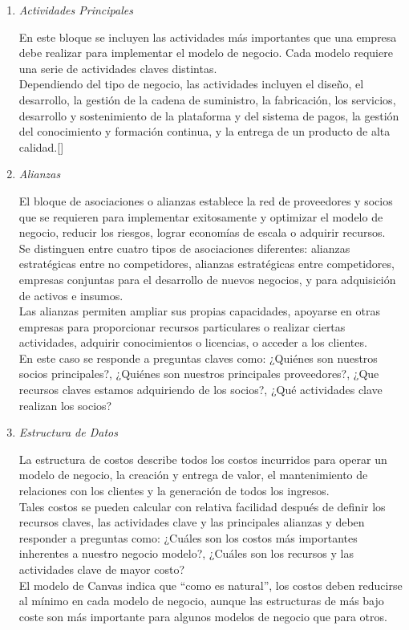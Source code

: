 \documentclass[10pt,a4paper]{article}
\begin{document}
\begin{multicols}{2}
\begin{enumerate}[1.]
			\item \textit{Actividades Principales}
			
			En este bloque se incluyen las actividades más importantes que una empresa debe realizar para implementar el modelo de negocio. Cada modelo requiere una serie de actividades claves distintas.\\
			
			Dependiendo del tipo de negocio, las actividades incluyen el diseño, el desarrollo, la gestión de la cadena de suministro, la fabricación, los servicios, desarrollo y sostenimiento de la plataforma y del sistema de pagos, la gestión del conocimiento y formación continua, y la entrega de un producto de alta calidad.[]
			
			\item \textit{Alianzas}
			
			El bloque de asociaciones o alianzas establece la red de proveedores y socios que se requieren para implementar exitosamente y optimizar el modelo de negocio, reducir los riesgos, lograr economías de escala o adquirir recursos.\\
			
			Se distinguen entre cuatro tipos de asociaciones diferentes: alianzas estratégicas entre no competidores, alianzas estratégicas entre competidores, empresas conjuntas para el desarrollo de nuevos negocios, y para adquisición de activos e insumos.\\
			
			Las alianzas permiten ampliar sus propias capacidades, apoyarse en otras empresas para proporcionar recursos particulares o realizar ciertas actividades, adquirir conocimientos o licencias, o acceder a los clientes.\\
			
			En este caso se responde a preguntas claves como: ¿Quiénes son nuestros socios principales?, ¿Quiénes son nuestros principales proveedores?, ¿Que recursos claves estamos adquiriendo de los socios?, ¿Qué actividades clave realizan los socios?
			
			\item \textit{Estructura de Datos}
			
			La estructura de costos describe todos los costos incurridos para operar un modelo de negocio, la creación y entrega de valor, el mantenimiento de relaciones con los clientes y la generación de todos los ingresos.\\
			
			Tales costos se pueden calcular con relativa facilidad después de definir los recursos claves, las actividades clave y las principales alianzas y deben responder a preguntas como: ¿Cuáles son los costos más importantes inherentes a nuestro negocio modelo?, ¿Cuáles son los recursos y las actividades clave de mayor costo?\\
El modelo de Canvas indica que “como es natural”, los costos deben reducirse al mínimo en cada modelo de negocio, aunque las estructuras de más bajo coste son más importante para algunos modelos de negocio que para otros.\\
			

\end{enumerate}
\end{multicols}
\end{document}
